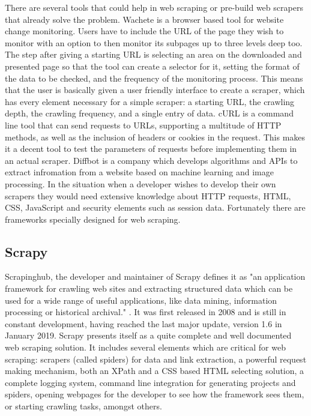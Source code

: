 \documentclass[12pt,a4paper,twoside]{report}
\begin{document}
There are several tools that could help in web scraping or pre-build web scrapers that already solve the problem. Wachete is a browser based tool for website change monitoring. Users have to include the URL of the page they wish to monitor with an option to then monitor its subpages up to three levels deep too. The step after giving a starting URL is selecting an area on the downloaded and presented page so that the tool can create a selector for it, setting the format of the data to be checked, and the frequency of the monitoring process. This means that the user is basically given a user friendly interface to create a scraper, which has every element necessary for a simple scraper: a starting URL, the crawling depth, the crawling frequency, and a single entry of data. cURL is a command line tool that can send requests to URLs, supporting a multitude of HTTP methods, as well as the inclusion of headers or cookies in the request. This makes it a decent tool to test the parameters of requests before implementing them in an actual scraper. Diffbot is a company which develops algorithms and APIs to extract infromation from a website based on machine learning and image processing. In the situation when a developer wishes to develop their own scrapers they would need extensive knowledge about HTTP requests, HTML, CSS, JavaScript and security elements such as session data. Fortunately there are frameworks specially designed for web scraping.


\subsection{Scrapy}

Scrapinghub, the developer and maintainer of Scrapy defines it as "an application framework for crawling web sites and extracting structured data which can be used for a wide range of useful applications, like data mining, information processing or historical archival." \cite{scrapy_docs}. It was first released in 2008 and is still in constant development, having reached the last major update, version 1.6 in January 2019. Scrapy presents itself as a quite complete and well documented web scraping solution. It includes several elements which are critical for web scraping: scrapers (called spiders) for data and link extraction, a powerful request making mechanism, both an XPath and a CSS based HTML selecting solution, a complete logging system, command line integration for generating projects and spiders, opening webpages for the developer to see how the framework sees them, or starting crawling tasks, amongst others.
\end{document}
